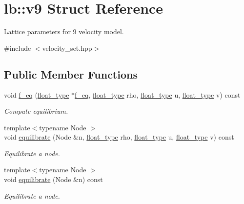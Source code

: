 \hypertarget{structlb_1_1v9}{\section{lb\-:\-:v9 \-Struct \-Reference}
\label{structlb_1_1v9}
}


\-Lattice parameters for 9 velocity model.  




{\ttfamily \#include $<$velocity\-\_\-set.\-hpp$>$}

\subsection*{\-Public \-Member \-Functions}
\begin{DoxyCompactItemize}
\item 
void \hyperlink{structlb_1_1v9_a28ff85fbeac34d9b9ed43e26217e298c}{f\-\_\-eq} (\hyperlink{namespacelb_a2b37d1585aef2d3da421ad0aedc6b11b}{float\-\_\-type} $\ast$\hyperlink{structlb_1_1v9_a28ff85fbeac34d9b9ed43e26217e298c}{f\-\_\-eq}, \hyperlink{namespacelb_a2b37d1585aef2d3da421ad0aedc6b11b}{float\-\_\-type} rho, \hyperlink{namespacelb_a2b37d1585aef2d3da421ad0aedc6b11b}{float\-\_\-type} u, \hyperlink{namespacelb_a2b37d1585aef2d3da421ad0aedc6b11b}{float\-\_\-type} v) const 
\begin{DoxyCompactList}\small\item\em \-Compute equilibrium. \end{DoxyCompactList}\item 
{\footnotesize template$<$typename Node $>$ }\\void \hyperlink{structlb_1_1v9_a6f56ccd9fcee711ac276745059f3e0b1}{equilibrate} (\-Node \&n, \hyperlink{namespacelb_a2b37d1585aef2d3da421ad0aedc6b11b}{float\-\_\-type} rho, \hyperlink{namespacelb_a2b37d1585aef2d3da421ad0aedc6b11b}{float\-\_\-type} u, \hyperlink{namespacelb_a2b37d1585aef2d3da421ad0aedc6b11b}{float\-\_\-type} v) const 
\begin{DoxyCompactList}\small\item\em \-Equilibrate a node. \end{DoxyCompactList}\item 
{\footnotesize template$<$typename Node $>$ }\\void \hyperlink{structlb_1_1v9_a22c525ed337cbe11c8e0e2d1bb069b95}{equilibrate} (\-Node \&n) const 
\begin{DoxyCompactList}\small\item\em \-Equilibrate a node. \end{DoxyCompactList}\end{DoxyCompactItemize}
